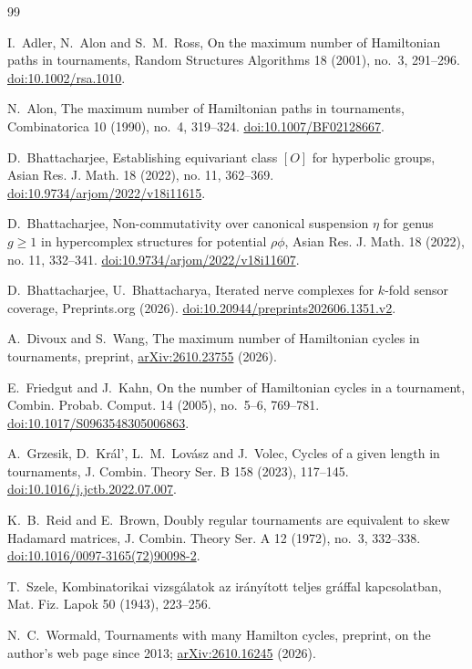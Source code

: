 \documentclass[11pt,a4paper,reqno]{amsart}
\theoremstyle{remark}
\numberwithin{equation}{section}
\begin{document}
\begin{thebibliography}{99}

I.~Adler, N.~Alon and S.~M.~Ross, On the maximum number of Hamiltonian paths in tournaments, Random Structures Algorithms 18 (2001), no.~3, 291--296. \href{https://doi.org/10.1002/rsa.1010}{doi:10.1002/rsa.1010}.

N.~Alon, The maximum number of Hamiltonian paths in tournaments, Combinatorica 10 (1990), no.~4, 319--324. \href{https://doi.org/10.1007/BF02128667}{doi:10.1007/BF02128667}.

D.~Bhattacharjee, Establishing equivariant class $[O]$ for hyperbolic groups, Asian Res. J. Math. 18 (2022), no. 11, 362--369. \href{https://doi.org/10.9734/arjom/2022/v18i11615}{doi:10.9734/arjom/2022/v18i11615}.

D.~Bhattacharjee, Non-commutativity over canonical suspension $\eta$ for genus $g\ge1$ in hypercomplex structures for potential $\rho\phi$, Asian Res. J. Math. 18 (2022), no. 11, 332--341. \href{https://doi.org/10.9734/arjom/2022/v18i11607}{doi:10.9734/arjom/2022/v18i11607}.

D.~Bhattacharjee, U.~Bhattacharya, Iterated nerve complexes for $k$-fold sensor coverage, Preprints.org (2026). \href{https://doi.org/10.20944/preprints202606.1351.v2}{doi:10.20944/preprints202606.1351.v2}.

A.~Divoux and S.~Wang, The maximum number of Hamiltonian cycles in tournaments, preprint, \href{https://arxiv.org/abs/2610.23755}{arXiv:2610.23755} (2026).

E.~Friedgut and J.~Kahn, On the number of Hamiltonian cycles in a tournament, Combin. Probab. Comput. 14 (2005), no.~5--6, 769--781. \href{https://doi.org/10.1017/S0963548305006863}{doi:10.1017/S0963548305006863}.

A.~Grzesik, D.~Kr\'al', L.~M.~Lov\'asz and J.~Volec, Cycles of a given length in tournaments, J. Combin. Theory Ser. B 158 (2023), 117--145. \href{https://doi.org/10.1016/j.jctb.2022.07.007}{doi:10.1016/j.jctb.2022.07.007}.

K.~B.~Reid and E.~Brown, Doubly regular tournaments are equivalent to skew Hadamard matrices, J. Combin. Theory Ser. A 12 (1972), no.~3, 332--338. \href{https://doi.org/10.1016/0097-3165(72)90098-2}{doi:10.1016/0097-3165(72)90098-2}.

T.~Szele, Kombinatorikai vizsg\'alatok az ir\'any\'itott teljes gr\'affal kapcsolatban, Mat. Fiz. Lapok 50 (1943), 223--256.

N.~C.~Wormald, Tournaments with many Hamilton cycles, preprint, on the author's web page since 2013; \href{https://arxiv.org/abs/2610.16245}{arXiv:2610.16245} (2026).

\end{thebibliography}
\end{document}
